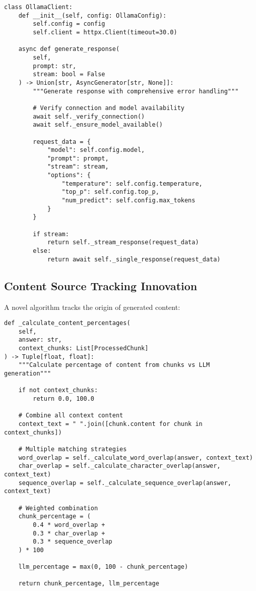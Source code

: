 \documentclass[10pt,a4paper,twocolumn]{article}
\begin{document}
\begin{lstlisting}[caption={Professional Ollama Client}]
class OllamaClient:
    def __init__(self, config: OllamaConfig):
        self.config = config
        self.client = httpx.Client(timeout=30.0)
    
    async def generate_response(
        self, 
        prompt: str, 
        stream: bool = False
    ) -> Union[str, AsyncGenerator[str, None]]:
        """Generate response with comprehensive error handling"""
        
        # Verify connection and model availability
        await self._verify_connection()
        await self._ensure_model_available()
        
        request_data = {
            "model": self.config.model,
            "prompt": prompt,
            "stream": stream,
            "options": {
                "temperature": self.config.temperature,
                "top_p": self.config.top_p,
                "num_predict": self.config.max_tokens
            }
        }
        
        if stream:
            return self._stream_response(request_data)
        else:
            return await self._single_response(request_data)
\end{lstlisting}

\subsection{Content Source Tracking Innovation}

A novel algorithm tracks the origin of generated content:

\begin{lstlisting}[caption={Content Source Tracking Algorithm}]
def _calculate_content_percentages(
    self, 
    answer: str, 
    context_chunks: List[ProcessedChunk]
) -> Tuple[float, float]:
    """Calculate percentage of content from chunks vs LLM generation"""
    
    if not context_chunks:
        return 0.0, 100.0
    
    # Combine all context content
    context_text = " ".join([chunk.content for chunk in context_chunks])
    
    # Multiple matching strategies
    word_overlap = self._calculate_word_overlap(answer, context_text)
    char_overlap = self._calculate_character_overlap(answer, context_text)
    sequence_overlap = self._calculate_sequence_overlap(answer, context_text)
    
    # Weighted combination
    chunk_percentage = (
        0.4 * word_overlap + 
        0.3 * char_overlap + 
        0.3 * sequence_overlap
    ) * 100
    
    llm_percentage = max(0, 100 - chunk_percentage)
    
    return chunk_percentage, llm_percentage
\end{lstlisting}
\end{document}
